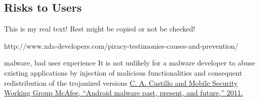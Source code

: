 \subsection{Risks to Users} \label{subsection:foundation-piracy-users}
This is my real text! Rest might be copied or not be checked!

http://www.xda-developers.com/piracy-testimonies-causes-and-prevention/

malware, bad user experience\newline
It is not unlikely for a malware developer to abuse existing applications by injection of malicious functionalities and consequent redistribution of the trojanized versions \url{C. A. Castillo and Mobile Security Working Group McAfee, “Android malware past, present, and future,” 2011.}
